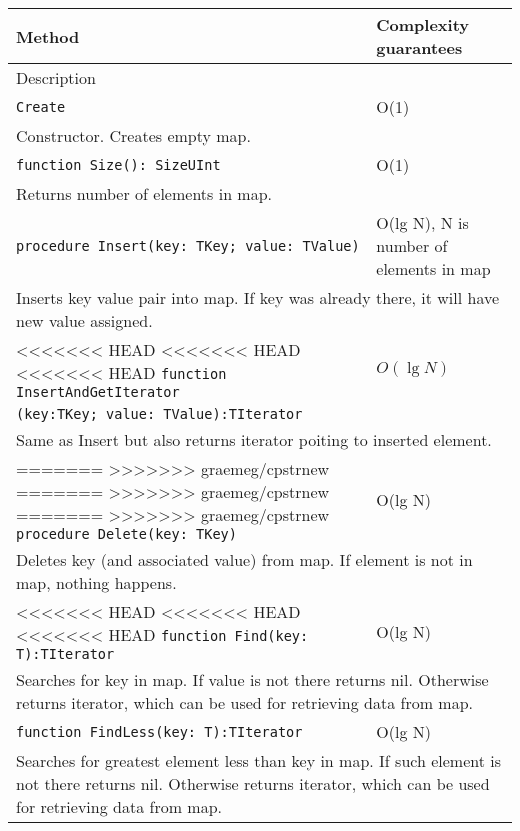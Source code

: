 \begin{longtable}{|m{10cm}|m{5cm}|}
\hline
Method & Complexity guarantees \\ \hline
\multicolumn{2}{|m{15cm}|}{Description} \\ \hline\hline

\verb!Create! & O(1) \\ \hline
\multicolumn{2}{|m{15cm}|}{Constructor. Creates empty map.} \\ \hline\hline

\verb!function Size(): SizeUInt! & O(1) \\ \hline
\multicolumn{2}{|m{15cm}|}{Returns number of elements in map.} \\\hline\hline

\verb!procedure Insert(key: TKey; value: TValue)! &
O(lg N), N is number of elements in map \\ \hline
\multicolumn{2}{|m{15cm}|}{Inserts key value pair into map. If key was already there, it will have
new value assigned.} \\\hline\hline

<<<<<<< HEAD
<<<<<<< HEAD
<<<<<<< HEAD
\verb!function InsertAndGetIterator! & $O(\lg N)$\\
\verb!(key:TKey; value: TValue):TIterator! & \\ \hline
\multicolumn{2}{|m{15cm}|}{Same as Insert but also returns iterator poiting to inserted element.} \\\hline\hline

=======
>>>>>>> graemeg/cpstrnew
=======
>>>>>>> graemeg/cpstrnew
=======
>>>>>>> graemeg/cpstrnew
\verb!procedure Delete(key: TKey)! &
O(lg N) \\ \hline
\multicolumn{2}{|m{15cm}|}{Deletes key (and associated value) from map. If element is not in map, nothing happens.} \\\hline\hline

<<<<<<< HEAD
<<<<<<< HEAD
<<<<<<< HEAD
\verb!function Find(key: T):TIterator! & O(lg N) \\\hline
\multicolumn{2}{|m{15cm}|}{Searches for key in map. If value is not there returns nil. Otherwise
returns iterator, which can be used for retrieving data from map.} \\\hline\hline

\verb!function FindLess(key: T):TIterator! & O(lg N) \\\hline
\multicolumn{2}{|m{15cm}|}{Searches for greatest element less than key in map. If such element is not there returns nil. Otherwise
returns iterator, which can be used for retrieving data from map.} \\\hline\hline


\end{longtable}
